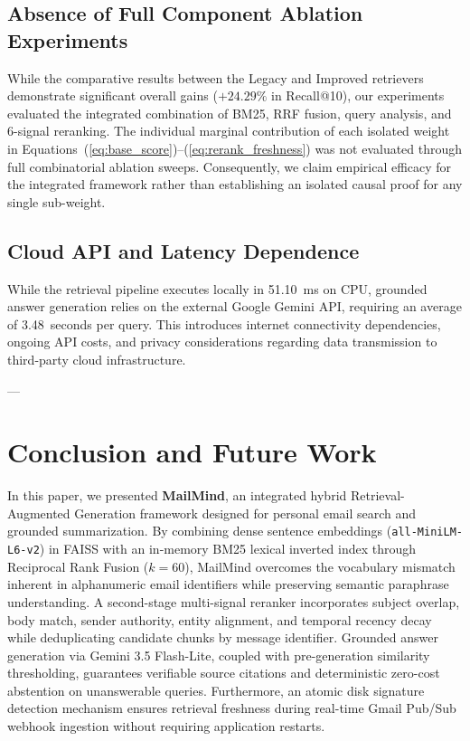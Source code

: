 \documentclass[11pt,a4paper]{article}
\begin{document}
\subsection{Absence of Full Component Ablation Experiments}
While the comparative results between the Legacy and Improved retrievers demonstrate significant overall gains ($+24.29\%$ in Recall@10), our experiments evaluated the integrated combination of BM25, RRF fusion, query analysis, and 6-signal reranking. The individual marginal contribution of each isolated weight in Equations~(\ref{eq:base_score})--(\ref{eq:rerank_freshness}) was not evaluated through full combinatorial ablation sweeps. Consequently, we claim empirical efficacy for the integrated framework rather than establishing an isolated causal proof for any single sub-weight.

\subsection{Cloud API and Latency Dependence}
While the retrieval pipeline executes locally in 51.10~ms on CPU, grounded answer generation relies on the external Google Gemini API, requiring an average of 3.48~seconds per query. This introduces internet connectivity dependencies, ongoing API costs, and privacy considerations regarding data transmission to third-party cloud infrastructure.

---

\section{Conclusion and Future Work}

In this paper, we presented \textbf{MailMind}, an integrated hybrid Retrieval-Augmented Generation framework designed for personal email search and grounded summarization. By combining dense sentence embeddings (\texttt{all-MiniLM-L6-v2}) in FAISS with an in-memory BM25 lexical inverted index through Reciprocal Rank Fusion ($k=60$), MailMind overcomes the vocabulary mismatch inherent in alphanumeric email identifiers while preserving semantic paraphrase understanding. A second-stage multi-signal reranker incorporates subject overlap, body match, sender authority, entity alignment, and temporal recency decay while deduplicating candidate chunks by message identifier. Grounded answer generation via Gemini 3.5 Flash-Lite, coupled with pre-generation similarity thresholding, guarantees verifiable source citations and deterministic zero-cost abstention on unanswerable queries. Furthermore, an atomic disk signature detection mechanism ensures retrieval freshness during real-time Gmail Pub/Sub webhook ingestion without requiring application restarts.
\end{document}
